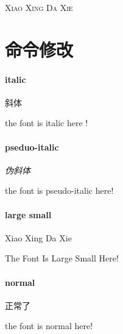 \documentclass[UTF8]{ctexart}
\begin{document}
\textsc{Xiao Xing Da Xie}

\vspace{5cm}

\part  {命令修改}
\subsection{italic}
\itshape

斜体

the font is italic here !

\subsection{pseduo-italic}
\slshape
伪斜体

the font is pseudo-italic here!

\subsection{large small}
\scshape

Xiao Xing Da Xie

The Font Is Large Small Here!

\subsection{normal}
\normalfont

正常了

the font is normal here!
\vspace{1cm}
\end{document}
